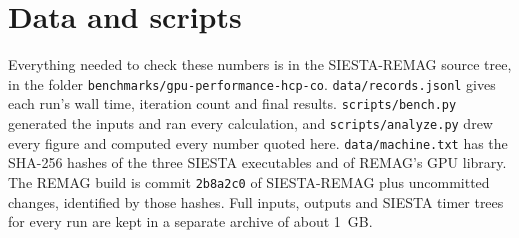 \section*{Data and scripts}

Everything needed to check these numbers is in the SIESTA-REMAG source tree, in the
folder \nolinkurl{benchmarks/gpu-performance-hcp-co}.
\nolinkurl{data/records.jsonl} gives each run's wall time, iteration count and final
results. \nolinkurl{scripts/bench.py} generated the inputs and ran every calculation, and
\nolinkurl{scripts/analyze.py} drew every figure and computed every number quoted here.
\nolinkurl{data/machine.txt} has the SHA-256 hashes of the three SIESTA executables and of
REMAG's GPU library. The REMAG build is commit \texttt{2b8a2c0} of SIESTA-REMAG plus
uncommitted changes, identified by those hashes. Full inputs, outputs and SIESTA timer
trees for every run are kept in a separate archive of about \SI{1}{GB}.
